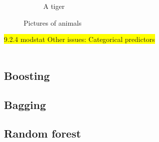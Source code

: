 \begin{figure}[h!]
\begin{subfigure}[b]{0.48\textwidth}
    \caption{A tiger}
    \label{fig:tiger}
  \end{subfigure}
  \caption{Pictures of animals}\label{fig:animals}
\end{figure}




\colorbox{yellow}{9.2.4 modstat Other issues: Categorical predictors} \\ \\
%




\subsection{Boosting}
\label{sub:Boosting}

\subsection{Bagging}
\label{sub:Bagging}

\subsection{Random forest}
\label{sub:Random forest}

